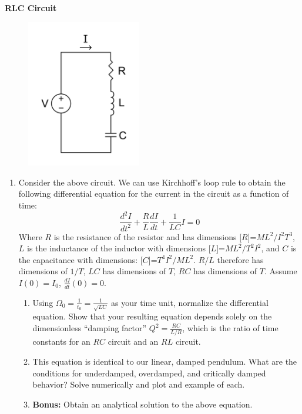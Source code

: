 \documentclass{article}
\begin{document}
{\large \textbf{RLC Circuit} }
\begin{figure}[!ht]
	\centering
	\includegraphics[width=5cm]{RLC_series_circuit_v1.pdf}
\end{figure}
\begin{enumerate}[resume]
	\item Consider the above circuit. We can use Kirchhoff's loop rule to obtain the following differential equation for the current in the circuit as a function of time:
	\begin{equation*}
		\frac{d^2I}{dt^2}+\frac{R}{L}\frac{dI}{dt} + \frac{1}{LC}I = 0
	\end{equation*}
	Where $R$ is the resistance of the resistor and has dimensions [$R$]=$ML^2/I^2T^3$, $L$ is the inductance of the inductor with dimensions [$L$]=$ML^2/T^2I^2$, and $C$ is the capacitance with dimensions: [$C$]=$T^4I^2/ML^2$. $R/L$ therefore has dimensions of $1/T$, $LC$ has dimensions of $T$, $RC$ has dimensions of $T$. Assume $I(0)=I_0$, $\frac{dI}{dt}(0)=0$.
	\begin{enumerate}
		\item Using $\Omega_0=\frac{1}{t_0}=\frac{1}{\sqrt{LC}}$ as your time unit, normalize the differential equation. Show that your resulting equation depends solely on the dimensionless ``damping factor'' $Q^2=\frac{RC}{L/R}$, which is the ratio of time constants for an $RC$ circuit and an $RL$ circuit.
		\item This equation is identical to our linear, damped pendulum. What are the conditions for underdamped, overdamped, and critically damped behavior? Solve numerically and plot and example of each.
		\item \textbf{Bonus:} Obtain an analytical solution to the above equation.
	\end{enumerate}
	
\end{enumerate}
\end{document}
